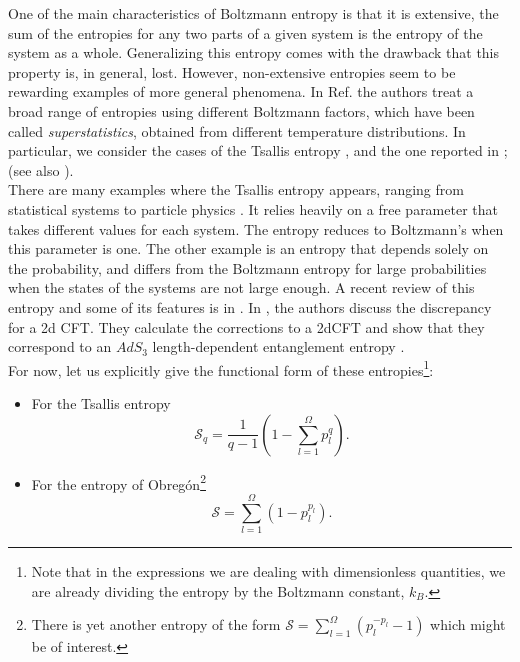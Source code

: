 \documentclass[nofootinbib,aps,prd,preprint,groupedaddress,showpacs,showkeys]{revtex4-1}
\begin{document}
\noindent One of the main characteristics of Boltzmann entropy is that it is extensive, the sum of the entropies for any two parts of a given system is the entropy of the system as a whole. Generalizing this entropy comes with the drawback that this property is, in general, lost. However, non-extensive entropies seem to be rewarding examples of more general phenomena. In Ref. \cite{BeckCohen} the authors treat a broad range of entropies using different Boltzmann factors, which have been called \textit{superstatistics}, obtained from different temperature distributions. In particular, we consider the cases of the Tsallis entropy \cite{Tsallis1}, and the one reported in \cite{Obregon1}; (see also \cite{Obregon2}).\\
\indent There are many examples where the Tsallis entropy appears, ranging from statistical systems to particle physics \cite{Tsallis2}. It relies heavily on a free parameter that takes different values for each system. The entropy reduces to Boltzmann's when this parameter is one. The other example is an entropy that depends solely on the probability, and differs from the Boltzmann entropy for large probabilities when the states of the systems are not large enough. A recent review of this entropy and some of its features is in \cite{Obregon3}. In \cite{ObregonCabo}, the authors discuss the discrepancy for a 2d CFT. They calculate the corrections to a 2dCFT and show that they correspond to an $AdS_3$ length-dependent entanglement entropy \cite{RT}.\\
\indent For now, let us explicitly give the functional form of these entropies\footnote{Note that in the expressions we are dealing with dimensionless quantities, we are already dividing the entropy by the Boltzmann constant, $k_B$.}:
\begin{itemize}
\item For the Tsallis entropy
\begin{equation}
\mathcal{S}_q = \frac{1}{q - 1} \left( 1 - \sum_{l=1}^{\Omega} p_l^{q} \right). \label{tsal}
\end{equation}

\item For the entropy of Obreg\'on\footnote{There is yet another entropy of the form $\mathcal{S} = \sum_{l=1}^{\Omega} \left( p_l^{-p_l} - 1\right)$ which might be of interest.}
\begin{equation}
\mathcal{S} = \sum_{l=1}^{\Omega} \left( 1 - p_l^{p_l}\right).
\end{equation}
\end{itemize}
\end{document}
